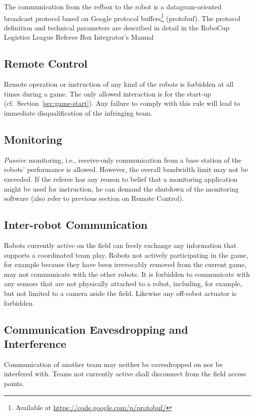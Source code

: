 \documentclass[12pt,twoside]{article}
\newcommand{\refsec}[1]{Section~\ref{#1}}
\begin{document}
The communication from the refbox to the robot is a datagram-oriented
broadcast protocol based on Google protocol buffers\footnote{Available
at \mbox{\url{https://code.google.com/p/protobuf/}}} (protobuf). The
protocol definition and technical parameters are described in detail
in the RoboCup Logistics League Referee Box Integrator's
Manual~\cite{RefBoxIntManual}

\subsection{Remote Control}
\label{sec:remote-control}
Remote operation or instruction of any kind of the robots is forbidden
at all times during a game. The only allowed interaction is for the
start-up (cf.~\refsec{sec:game-start}). Any failure to comply with
this rule will lead to immediate disqualification of the infringing
team.

\subsection{Monitoring}
\label{sec:monitoring}
\emph{Passive} monitoring, i.e., receive-only communication from a base
station of the robots' performance is allowed. However, the overall
bandwidth limit may not be exceeded.
If the referee has any reason to belief that a monitoring application
might be used for instruction, he can demand the shutdown of the
monitoring software (also refer to previous section on Remote
Control).

\subsection{Inter-robot Communication}
\label{sec:inter-robot-comm}
Robots currently active on the field can freely exchange any
information that supports a coordinated team play. Robots not actively
participating in the game, for example because they have been
irrevocably removed from the current game, may not communicate with
the other robots. It is forbidden to communicate with any sensors that
are not physically attached to a robot, including, for example, but
not limited to a camera aside the field. Likewise any off-robot
actuator is forbidden.

\subsection{Communication Eavesdropping and Interference}
\label{sec:comm-tampering}
Communication of another team may neither be eavesdropped on nor be
interfered with. Teams not currently active shall disconnect from the
field access points.
\end{document}
